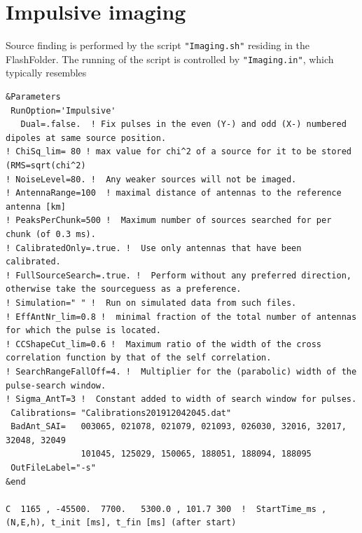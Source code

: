 \clearpage
\section{Impulsive imaging}

Source finding is performed by the script \verb!"Imaging.sh"! residing in the FlashFolder. The running of the script is controlled by \verb!"Imaging.in"!, which typically resembles


\begin{linenumbers}
\resetlinenumber
\tiny
\begin{verbatim}
&Parameters
 RunOption='Impulsive'
   Dual=.false.  ! Fix pulses in the even (Y-) and odd (X-) numbered dipoles at same source position.
! ChiSq_lim= 80 ! max value for chi^2 of a source for it to be stored (RMS=sqrt(chi^2)
! NoiseLevel=80. !  Any weaker sources will not be imaged.
! AntennaRange=100	! maximal distance of antennas to the reference antenna [km]
! PeaksPerChunk=500 !  Maximum number of sources searched for per chunk (of 0.3 ms).
! CalibratedOnly=.true. !  Use only antennas that have been calibrated.
! FullSourceSearch=.true. !  Perform without any preferred direction, otherwise take the sourceguess as a preference.
! Simulation=" " !  Run on simulated data from such files.
! EffAntNr_lim=0.8 !  minimal fraction of the total number of antennas for which the pulse is located.
! CCShapeCut_lim=0.6 !  Maximum ratio of the width of the cross correlation function by that of the self correlation.
! SearchRangeFallOff=4. !  Multiplier for the (parabolic) width of the pulse-search window.
! Sigma_AntT=3 !  Constant added to width of search window for pulses.
 Calibrations= "Calibrations201912042045.dat"
 BadAnt_SAI=   003065, 021078, 021079, 021093, 026030, 32016, 32017, 32048, 32049
               101045, 125029, 150065, 188051, 188094, 188095
 OutFileLabel="-s"
&end

C  1165 , -45500.  7700.   5300.0 , 101.7 300  !  StartTime_ms , (N,E,h), t_init [ms], t_fin [ms] (after start)
\end{verbatim}
\end{linenumbers}

